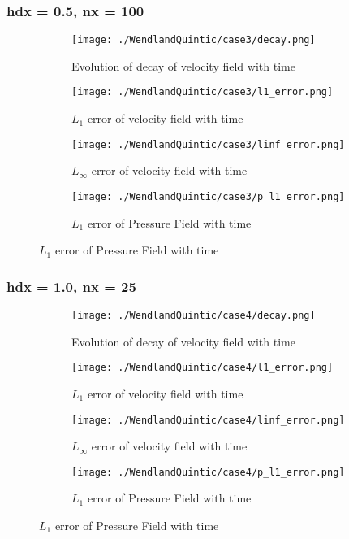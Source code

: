 \documentclass[11pt, a4paper]{article}
\begin{document}
\subsubsection{hdx = 0.5, nx = 100}
\begin{figure}[H]
\begin{subfigure}{0.48\textwidth}
\texttt{[image: ./WendlandQuintic/case3/decay.png]}
\caption{Evolution of decay of velocity field with time}
\end{subfigure}
\begin{subfigure}{0.48\textwidth}
\texttt{[image: ./WendlandQuintic/case3/l1\_error.png]}
\caption{$L_1$ error of velocity field with time}
\end{subfigure}
\medskip
\begin{subfigure}{0.48\textwidth}
\texttt{[image: ./WendlandQuintic/case3/linf\_error.png]}
\caption{$L_\infty$ error of velocity field with time}
\end{subfigure}
\begin{subfigure}{0.48\textwidth}
\texttt{[image: ./WendlandQuintic/case3/p\_l1\_error.png]}
\caption{$L_1$ error of Pressure Field with time}
\end{subfigure}
\end{figure}

\subsubsection{hdx = 1.0, nx = 25}
\begin{figure}[H]
\begin{subfigure}{0.48\textwidth}
\texttt{[image: ./WendlandQuintic/case4/decay.png]}
\caption{Evolution of decay of velocity field with time}
\end{subfigure}
\begin{subfigure}{0.48\textwidth}
\texttt{[image: ./WendlandQuintic/case4/l1\_error.png]}
\caption{$L_1$ error of velocity field with time}
\end{subfigure}
\medskip
\begin{subfigure}{0.48\textwidth}
\texttt{[image: ./WendlandQuintic/case4/linf\_error.png]}
\caption{$L_\infty$ error of velocity field with time}
\end{subfigure}
\begin{subfigure}{0.48\textwidth}
\texttt{[image: ./WendlandQuintic/case4/p\_l1\_error.png]}
\caption{$L_1$ error of Pressure Field with time}
\end{subfigure}
\end{figure}
\end{document}
